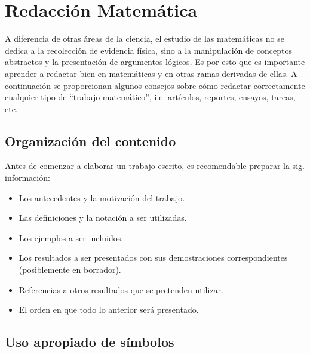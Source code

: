 \chapter{Redacción Matemática}

A diferencia de otras áreas de la ciencia, el estudio de las matemáticas
no se dedica a la recolección de evidencia física, sino a la manipulación
de conceptos abstractos y la presentación de argumentos lógicos. Es
por esto que es importante aprender a redactar bien en matemáticas y 
en otras ramas derivadas de ellas. 
A continuación se proporcionan algunos consejos sobre cómo redactar 
correctamente cualquier tipo de ``trabajo matemático'', i.e. artículos, 
reportes, ensayos, tareas, etc.

\section{Organización del contenido}

Antes de comenzar a elaborar un trabajo escrito, es recomendable preparar
la sig. información:

\begin{itemize}
    \item Los antecedentes y la motivación del trabajo.
    \item Las definiciones y la notación a ser utilizadas.
    \item Los ejemplos a ser incluidos.
    \item Los resultados a ser presentados con sus demostraciones correspondientes
    (posiblemente en borrador). 
    \item Referencias a otros resultados que se pretenden utilizar.
    \item El orden en que todo lo anterior será presentado.
\end{itemize}

\section{Uso apropiado de símbolos}

